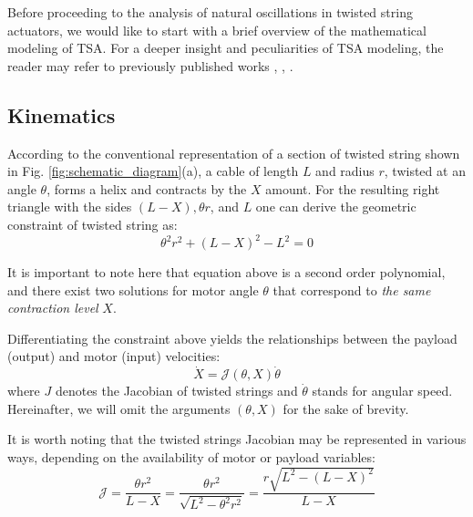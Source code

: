 Before proceeding to the analysis of natural oscillations in twisted string actuators, we would like to start with a brief overview of the mathematical modeling of TSA. For a deeper insight and peculiarities of TSA modeling, the reader may refer to previously published works \cite{nedelchev2020accurate}, \cite{popov2012study}, \cite{palli2012modeling}.

\subsection{Kinematics}




According to the conventional representation of a section of twisted string shown in Fig. \ref{fig:schematic_diagram}(a), a cable of length $L$ and radius $r$, twisted at an angle $\theta$, forms a helix and contracts by the $X$ amount. For the resulting right triangle with the sides $(L-X),\theta r$, and $L$ one can derive the geometric constraint of twisted string as:
\begin{equation}\label{eq.mod:geom_const}
\theta^2 r^2 + (L-X)^2 - L^2 = 0  
\end{equation}

It is important to note here that equation above is a second order polynomial, and there exist two solutions for motor angle $\theta$ that correspond to \textit{the same contraction level} $X$.

Differentiating the constraint above yields the relationships between the payload (output) and motor (input) velocities:
\begin{equation}\label{eq.mod:x_dot}
\dot{X} = \mathcal{J}(\theta, X)\dot{\theta}
\end{equation}
where $J$ denotes the Jacobian of twisted strings and $\dot{\theta}$ stands for angular speed. Hereinafter, we will omit the arguments $(\theta, X)$ for the sake of brevity.


It is worth noting that the twisted strings Jacobian may be represented in various ways, depending on the availability of motor or payload variables:
\begin{equation}\label{eq.mod:jacobian}
    \mathcal{J} = \frac{\theta r^2}{L-X} = \frac{\theta r^2}{\sqrt{L^2 - \theta^2 r^2}} = \frac{r \sqrt{L^2 - (L -X)^2}}{L-X} 
\end{equation}

